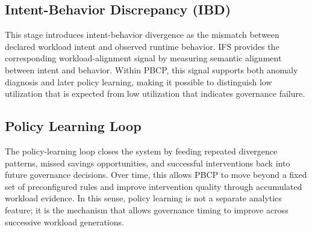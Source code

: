 \subsection{Intent-Behavior Discrepancy (IBD)}

This stage introduces intent-behavior divergence as the mismatch between
declared workload intent and observed runtime behavior. IFS provides the
corresponding workload-alignment signal by measuring semantic alignment between
intent and behavior. Within PBCP, this signal supports both anomaly diagnosis
and later policy learning, making it possible to distinguish low utilization
that is expected from low utilization that indicates governance failure.



\subsection{Policy Learning Loop}

The policy-learning loop closes the system by feeding repeated divergence
patterns, missed savings opportunities, and successful interventions back into
future governance decisions. Over time, this allows PBCP to move beyond a fixed
set of preconfigured rules and improve intervention quality through accumulated
workload evidence. In this sense, policy learning is not a separate analytics
feature; it is the mechanism that allows governance timing to improve across
successive workload generations.
